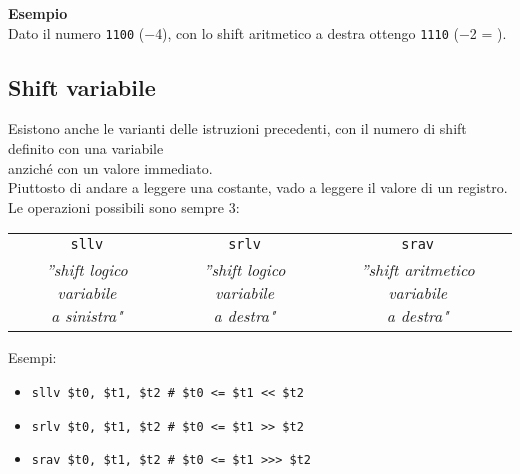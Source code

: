 \documentclass[../main.tex]{subfiles}
\begin{document}
\noindent
\textbf{Esempio} \\
Dato il numero \texttt{1100} ($-$4), con lo shift aritmetico a destra
ottengo \texttt{1110} ($-$2 = ).

\newpage

\subsection{Shift variabile}
Esistono anche le varianti delle istruzioni precedenti,
con il numero di shift definito con una variabile \\
anziché con un valore immediato. \\
Piuttosto di andare a leggere una costante, vado a leggere
il valore di un registro. \\
Le operazioni possibili sono sempre 3:
\begin{table}[h!]
    \centering

    \setlength{\tabcolsep}{24pt}
    \begin{tabular}{ c | c | c }
        \texttt{sllv} & \texttt{srlv} & \texttt{srav} \\
        \makecell{\textit{''shift logico variabile} \\ \textit{a sinistra"}} & \makecell{\textit{''shift logico variabile} \\ \textit{a destra"}} & \makecell{\textit{''shift aritmetico variabile} \\ \textit{a destra"}} \\
    \end{tabular}
\end{table}

\noindent
Esempi:
\begin{itemize}
    \item \texttt{sllv \$t0, \$t1, \$t2 \hspace*{0cm} \hspace*{0cm} \# \$t0 <= \$t1 << \$t2}
    \item \texttt{srlv \$t0, \$t1, \$t2 \hspace*{0cm} \hspace*{0cm} \# \$t0 <= \$t1 >> \$t2}
    \item \texttt{srav \$t0, \$t1, \$t2 \hspace*{0cm} \hspace*{0cm} \# \$t0 <= \$t1 >>> \$t2}
\end{itemize}

\vspace*{5mm}
\end{document}
